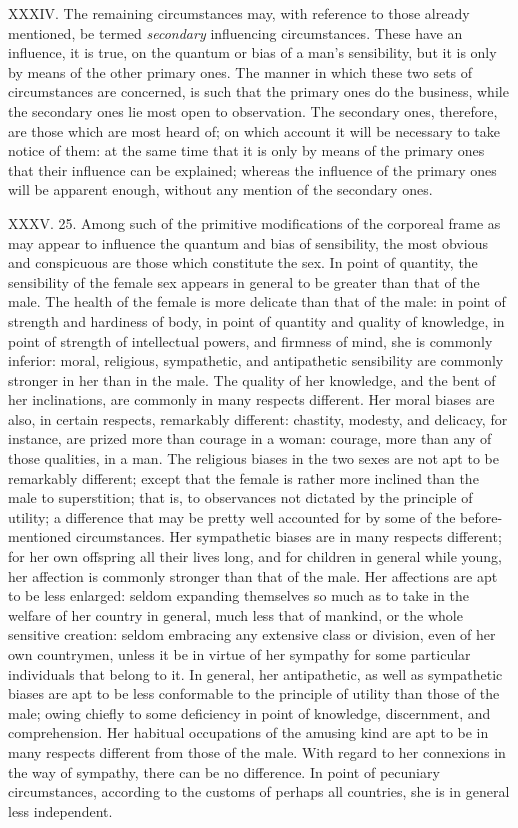 \documentclass[12pt]{report}
\begin{document}
XXXIV. The remaining circumstances may, with reference to those already
mentioned, be termed \emph{secondary} influencing circumstances. These
have an influence, it is true, on the quantum or bias of a man's
sensibility, but it is only by means of the other primary ones. The
manner in which these two sets of circumstances are concerned, is such
that the primary ones do the business, while the secondary ones lie most
open to observation. The secondary ones, therefore, are those which are
most heard of; on which account it will be necessary to take notice of
them: at the same time that it is only by means of the primary ones that
their influence can be explained; whereas the influence of the primary
ones will be apparent enough, without any mention of the secondary ones.

XXXV. 25. Among such of the primitive modifications of the corporeal
frame as may appear to influence the quantum and bias of sensibility,
the most obvious and conspicuous are those which constitute the sex. In
point of quantity, the sensibility of the female sex appears in general
to be greater than that of the male. The health of the female is more
delicate than that of the male: in point of strength and hardiness of
body, in point of quantity and quality of knowledge, in point of
strength of intellectual powers, and firmness of mind, she is commonly
inferior: moral, religious, sympathetic, and antipathetic sensibility
are commonly stronger in her than in the male. The quality of her
knowledge, and the bent of her inclinations, are commonly in many
respects different. Her moral biases are also, in certain respects,
remarkably different: chastity, modesty, and delicacy, for instance, are
prized more than courage in a woman: courage, more than any of those
qualities, in a man. The religious biases in the two sexes are not apt
to be remarkably different; except that the female is rather more
inclined than the male to superstition; that is, to observances not
dictated by the principle of utility; a difference that may be pretty
well accounted for by some of the before-mentioned circumstances. Her
sympathetic biases are in many respects different; for her own offspring
all their lives long, and for children in general while young, her
affection is commonly stronger than that of the male. Her affections are
apt to be less enlarged: seldom expanding themselves so much as to take
in the welfare of her country in general, much less that of mankind, or
the whole sensitive creation: seldom embracing any extensive class or
division, even of her own countrymen, unless it be in virtue of her
sympathy for some particular individuals that belong to it. In general,
her antipathetic, as well as sympathetic biases are apt to be less
conformable to the principle of utility than those of the male; owing
chiefly to some deficiency in point of knowledge, discernment, and
comprehension. Her habitual occupations of the amusing kind are apt to
be in many respects different from those of the male. With regard to her
connexions in the way of sympathy, there can be no difference. In point
of pecuniary circumstances, according to the customs of perhaps all
countries, she is in general less independent.
\end{document}

